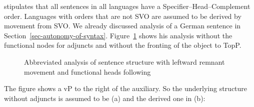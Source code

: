 \citet{Kayne94a-u} stipulates that all sentences in all languages have a Specifier–Head–Complement
order. Languages with orders that are not SVO are assumed to be derived by movement from SVO. We
already discussed  analysis of a German sentence in
Section~\ref{sec-autonomy-of-syntax}. Figure~\ref{fig-Kayne-for-German} shows his analysis without
the functional nodes for adjuncts and without the fronting of the object to TopP.


\begin{figure}
\oneline{%
\begin{forest}
sm edges
[CP
	[C$^0$[weil;because, tier=word]]
		[SubjP
			[DP$_i$ [der Mann;the man,roof]]
				[ObjP
					[DP$_j$ [diese Sonate;this sonata,roof]]
								[AuxP
									[VP$_k$ [gespielt;played,tier=word]]
									[Aux+
										[Aux [hat;has,tier=word]]
										[vP
											[DP$_i$ [,phantom]]
											[VP$_k$
												[V [,phantom]]
												[DP$_j$
                                                                                                  [,phantom]]]]]]]]]
\end{forest}%
}
\caption{\label{fig-Kayne-for-German}Abbreviated analysis of sentence structure with leftward remnant movement
  and functional heads following \citet[]{Laenzlinger2004a}}
\end{figure}%

The figure shows a vP to the right of the auxiliary. So the underlying structure without adjuncts is assumed to be
(a) and the derived one in (b):
\eal
{}
\zl

